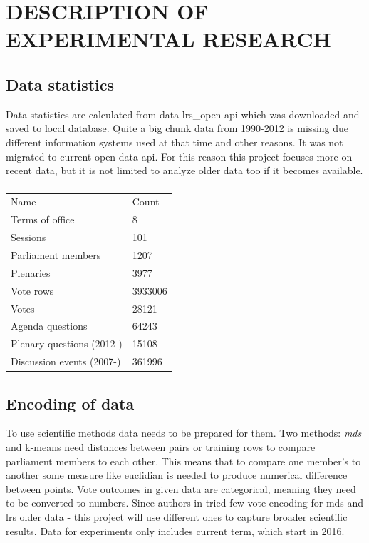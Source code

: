 \documentclass[a4paper,12pt]{article}
\begin{document}
    \section{DESCRIPTION OF EXPERIMENTAL RESEARCH}
    \subsection{Data statistics}
    
   	Data statistics are calculated from data \gls{lrs_open} \acrshort{api} which was downloaded and saved to local database. Quite a big chunk data from 1990-2012 is missing due different information systems used at that time and other reasons. It was not migrated to current open data \acrshort{api}. For this reason this project focuses more on recent data, but it is not limited to analyze older data too if it becomes available.
    
   	\noindent
    \begin{center}
    	\begin{tabular}{L{5cm} R{3cm}}
    		\\ 
    		\hline
    		Name & Count \\\hline
    		Terms of office & 8\\
    		Sessions & 101\\
    		Parliament members & 1207\\
    		Plenaries & 3977\\
    		Vote rows & 3933006\\
    		Votes & 28121\\
    		Agenda questions & 64243\\
    		Plenary questions (2012-) & 15108\\
    		Discussion events (2007-) & 361996\\
    		\hline
    	\end{tabular}
    	 \label{tab:data_statistics}
    \end{center}

    
    \hfill 
    
   	\subsection{Encoding of data} 
   	
   	To use scientific methods data needs to be prepared for them. Two methods: \textit{\acrshort{mds}} and \gls{k-means} need distances between pairs or training rows to compare parliament members to each other. This means that to compare one member's to another some measure like \gls{euclidian} is needed to produce numerical difference between points. Vote outcomes in given data are categorical, meaning they need to be converted to numbers. Since authors in  \cite{vytautas_mick_magistrinis} tried few vote encoding for \acrshort{mds} and \gls{lrs} older data - this project will use different ones to capture broader scientific results. Data for experiments only includes current term, which start in 2016.
   	
\end{document}
